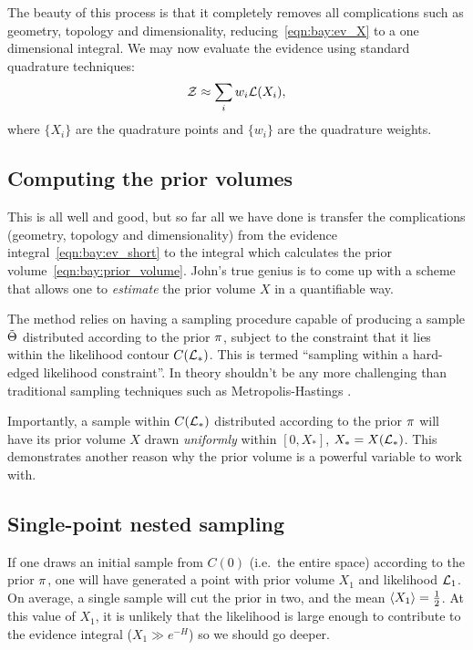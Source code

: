 The beauty of this process is that it completely removes all complications such as geometry, topology and dimensionality, reducing~\eqref{eqn:bay:ev_X} to a one dimensional integral.  We may now evaluate the evidence using standard quadrature techniques:
\begin{equation}
  \mathcal{Z} \approx \sum_{i} w_i \mathcal{L}(X_i),
  \label{eqn:bay:quadrature}
\end{equation}
where $\{X_i\}$ are the quadrature points and $\{w_i\}$ are the quadrature weights. 

\subsection{Computing the prior volumes}

This is all well and good, but so far all we have done is transfer the complications (geometry, topology and dimensionality) from the evidence integral~\eqref{eqn:bay:ev_short} to the integral which calculates the prior volume~\eqref{eqn:bay:prior_volume}. John's true genius is to come up with a scheme that allows one to {\em estimate\/} the prior volume $X$ in a quantifiable way.

The method relies on having a sampling procedure capable of producing a sample $\tilde{\Theta}$ distributed according to the prior $\pi$, subject to the constraint that it lies within the likelihood contour $C(\mathcal{L}_\ast)$.  This is termed ``sampling within a hard-edged likelihood constraint''.  In theory shouldn't be any more challenging than traditional sampling techniques such as Metropolis-Hastings \citep{skilling2006}. 

Importantly, a sample within $C(\mathcal{L}_\ast)$ distributed according to the prior $\pi$ will have its prior volume $X$ drawn {\em uniformly\/} within $[0,X_\ast]$, $X_\ast=X(\mathcal{L}_\ast)$. This demonstrates another reason why the prior volume is a powerful variable to work with.

\subsection{Single-point nested sampling}

If one draws an initial sample from $C(0)$ (i.e.\ the entire space) according to the prior $\pi$, one will have generated a point with prior volume $X_1$ and likelihood $\mathcal{L}_1$. On average, a single sample will cut the prior in two, and the mean ${\left\langle{X_1}\right\rangle}=\frac{1}{2}$. At this value of $X_1$, it is unlikely that the likelihood is large enough to contribute to the evidence integral ($X_1\gg e^{-H}$) so we should go deeper.

